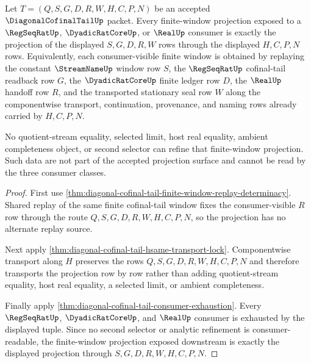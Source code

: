 \begin{theorem}
\label{thm:diagonal-cofinal-tail-window-projection-exactness}
Let $T=(Q,S,G,D,R,W,H,C,P,N)$ be an accepted $\DiagonalCofinalTailUp$ packet. Every finite-window projection exposed to a $\RegSeqRatUp$, $\DyadicRatCoreUp$, or $\RealUp$ consumer is exactly the projection of the displayed $S,G,D,R,W$ rows through the displayed $H,C,P,N$ rows. Equivalently, each consumer-visible finite window is obtained by replaying the constant $\StreamNameUp$ window row $S$, the $\RegSeqRatUp$ cofinal-tail readback row $G$, the $\DyadicRatCoreUp$ finite ledger row $D$, the $\RealUp$ handoff row $R$, and the transported stationary seal row $W$ along the componentwise transport, continuation, provenance, and naming rows already carried by $H,C,P,N$.

No quotient-stream equality, selected limit, host real equality, ambient completeness object, or second selector can refine that finite-window projection. Such data are not part of the accepted projection surface and cannot be read by the three consumer classes.
\end{theorem}
\begin{proof}
First use \autoref{thm:diagonal-cofinal-tail-finite-window-replay-determinacy}. Shared replay of the same finite cofinal-tail window fixes the consumer-visible $R$ row through the route $Q,S,G,D,R,W,H,C,P,N$, so the projection has no alternate replay source.

Next apply \autoref{thm:diagonal-cofinal-tail-hsame-transport-lock}. Componentwise transport along $H$ preserves the rows $Q,S,G,D,R,W,H,C,P,N$ and therefore transports the projection row by row rather than adding quotient-stream equality, host real equality, a selected limit, or ambient completeness.

Finally apply \autoref{thm:diagonal-cofinal-tail-consumer-exhaustion}. Every $\RegSeqRatUp$, $\DyadicRatCoreUp$, and $\RealUp$ consumer is exhausted by the displayed tuple. Since no second selector or analytic refinement is consumer-readable, the finite-window projection exposed downstream is exactly the displayed projection through $S,G,D,R,W,H,C,P,N$.
\end{proof}


